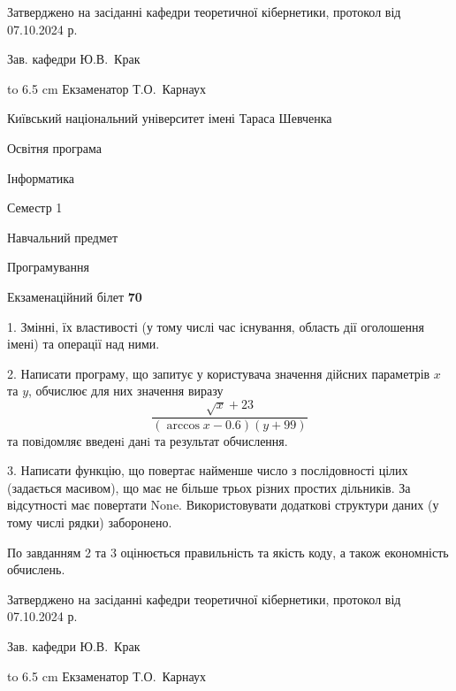 \documentclass[12pt, ukrainian]{article}
\begin{document}
{\smallskip\smallskip \begin {scriptsize} Затверджено на засіданні кафедри теоретичної кібернетики, протокол   від   07.10.2024 р.\par\smallskip\smallskip\smallskip\smallskip
{\parbox {6.5 cm} {Зав. кафедри \dotfill Ю.В.~Крак}}\hspace {0.7cm} {\hbox to 6.5 cm { Екзаменатор \dotfill Т.О.~Карнаух}} \end{scriptsize}}
\newpage
{{\begin {scriptsize}\par
{ \center  Київський національний університет імені Тараса Шевченка \par}
{\parbox {5 cm}{Освітня програма \hfill}{\parbox {7 cm}{Інформатика\hfill}}\parbox {6 cm}{\hfill Семестр 1}}\par
{\parbox {5 cm} {Навчальний предмет \hfill}\parbox {7 cm}{Програмування \hfill}\parbox {6cm}{\hfill}\par}\vspace{-15pt} \end{scriptsize}}{\center Екзаменаційний білет \No \textbf { 70 }\par}}
{%
1. Змінні, їх властивості (у тому числі час існування, область дії оголошення імені) та операції над ними.%
\par
2. Написати програму, що запитує у користувача значення дійсних параметрів $x$ та $y$, обчислює для них значення виразу 
$$\frac{\sqrt x + 23}{(\arccos x - 0.6) (y + 99)}$$ 
та повiдомляє введенi данi та результат обчислення.

\par
3. Написати функцію, що повертає найменше число з послідовності цілих (задається масивом), що має не більше трьох різних простих дільників. За відсутності має повертати None. Використовувати додаткові структури даних (у тому числі рядки) заборонено.

По завданням 2 та 3 оцінюється правильність та якість коду, а також економність обчислень.

}
{\smallskip\smallskip \begin {scriptsize} Затверджено на засіданні кафедри теоретичної кібернетики, протокол   від   07.10.2024 р.\par\smallskip\smallskip\smallskip\smallskip
{\parbox {6.5 cm} {Зав. кафедри \dotfill Ю.В.~Крак}}\hspace {0.7cm} {\hbox to 6.5 cm { Екзаменатор \dotfill Т.О.~Карнаух}} \end{scriptsize}}
\vspace{0.9cm}
\end{document}
